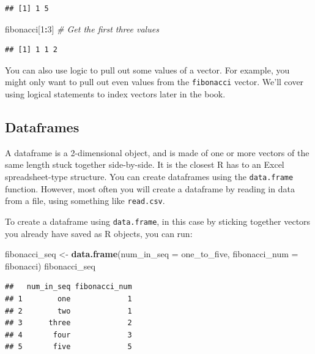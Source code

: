 \documentclass[]{book}
\makeatletter
\newenvironment{Shaded}{\begin{snugshade}}{\end{snugshade}}
\newcommand{\KeywordTok}[1]{\textcolor[rgb]{0.13,0.29,0.53}{\textbf{#1}}}
\newcommand{\DataTypeTok}[1]{\textcolor[rgb]{0.13,0.29,0.53}{#1}}
\newcommand{\DecValTok}[1]{\textcolor[rgb]{0.00,0.00,0.81}{#1}}
\newcommand{\StringTok}[1]{\textcolor[rgb]{0.31,0.60,0.02}{#1}}
\newcommand{\CommentTok}[1]{\textcolor[rgb]{0.56,0.35,0.01}{\textit{#1}}}
\newcommand{\OperatorTok}[1]{\textcolor[rgb]{0.81,0.36,0.00}{\textbf{#1}}}
\newcommand{\NormalTok}[1]{#1}
\newenvironment{kframe}{%
\medskip{}
\setlength{\fboxsep}{.8em}
 \def\at@end@of@kframe{}%
 \ifinner\ifhmode%
  \def\at@end@of@kframe{\end{minipage}}%
  \begin{minipage}{\columnwidth}%
 \fi\fi%
 \def\FrameCommand##1{\hskip\@totalleftmargin \hskip-\fboxsep
 \colorbox{shadecolor}{##1}\hskip-\fboxsep
     \hskip-\linewidth \hskip-\@totalleftmargin \hskip\columnwidth}%
 \MakeFramed {\advance\hsize-\width
   \@totalleftmargin\z@ \linewidth\hsize
   \@setminipage}}%
 {\par\unskip\endMakeFramed%
 \at@end@of@kframe}
\renewenvironment{Shaded}{\begin{kframe}}{\end{kframe}}
\theoremstyle{definition}
\theoremstyle{definition}
\theoremstyle{definition}
\theoremstyle{remark}
\makeatother
\begin{document}
\begin{verbatim}
## [1] 1 5
\end{verbatim}

\begin{Shaded}
\begin{Highlighting}[]
\NormalTok{fibonacci[}\DecValTok{1}\OperatorTok{:}\DecValTok{3}\NormalTok{] }\CommentTok{# Get the first three values}
\end{Highlighting}
\end{Shaded}

\begin{verbatim}
## [1] 1 1 2
\end{verbatim}

You can also use logic to pull out some values of a vector. For example,
you might only want to pull out even values from the \texttt{fibonacci}
vector. We'll cover using logical statements to index vectors later in
the book.

\subsection{Dataframes}\label{dataframes}

A dataframe is a 2-dimensional object, and is made of one or more
vectors of the same length stuck together side-by-side. It is the
closest R has to an Excel spreadsheet-type structure. You can create
dataframes using the \texttt{data.frame} function. However, most often
you will create a dataframe by reading in data from a file, using
something like \texttt{read.csv}.

To create a dataframe using \texttt{data.frame}, in this case by
sticking together vectors you already have saved as R objects, you can
run:

\begin{Shaded}
\begin{Highlighting}[]
\NormalTok{fibonacci_seq <-}\StringTok{ }\KeywordTok{data.frame}\NormalTok{(}\DataTypeTok{num_in_seq =}\NormalTok{ one_to_five,}
                            \DataTypeTok{fibonacci_num =}\NormalTok{ fibonacci)}
\NormalTok{fibonacci_seq}
\end{Highlighting}
\end{Shaded}

\begin{verbatim}
##   num_in_seq fibonacci_num
## 1        one             1
## 2        two             1
## 3      three             2
## 4       four             3
## 5       five             5
\end{verbatim}
\end{document}

